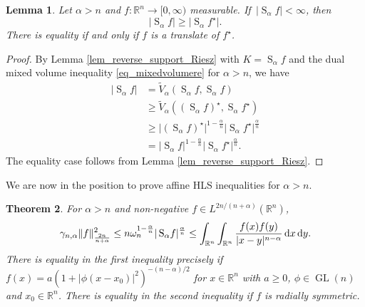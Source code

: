 \documentclass{amsart}
\newtheorem{theorem}{Theorem}
\newtheorem{lemma}[theorem]{Lemma}
\newcommand{\gln}{\operatorname{GL}(n)}
\newcommand{\R}{\mathbb R}
\renewcommand{\d}{\,\mathrm{d}}
\newcommand{\vol}[1]{\vert #1\vert}
\newcommand{\hls}[1]{\operatorname{S}_{#1}\!} %
\begin{document}
\begin{lemma}\label{lem_new_rearrangement2}
Let $\alpha>n$ and $f:\R^n\to [0,\infty)$ measurable. If 
$\,\vol{\hls \alpha f}<\infty$, then
\begin{equation}
\vol{\hls \alpha f}\ge \vol{\hls \alpha f^\star}.
\end{equation}
There is equality if and only if $f$ is a translate of $f^\star$. 
\end{lemma}
\begin{proof} By Lemma \ref{lem_reverse_support_Riesz} with $K=\hls \alpha f$ and the dual mixed volume inequality \eqref{eq_mixedvolumere} for $\alpha>n$,  we have
\begin{align}
	\vol{\hls\alpha f}
	&= \tilde V_\alpha(\hls \alpha f, \hls\alpha f)\\ 
	&\geq \tilde V_\alpha((\hls\alpha f)^\star, \hls\alpha f^\star)\\
	&\geq \vol{(\hls\alpha f)^\star}^{1-\frac {\alpha}n} \vol{\hls\alpha f^\star}^{\frac \alpha n}\\
	&= \vol{\hls \alpha f}^{1-\frac {\alpha}n} \vol{\hls\alpha f^\star}^{\frac \alpha n}.
\end{align}
The equality case follows from Lemma \ref{lem_reverse_support_Riesz}. 
\end{proof}

We are now in the position to prove affine HLS inequalities for $\alpha>n$.

\begin{theorem}\label{thm_aHLS2}
For $\alpha>n$ and non-negative $f\in L^{{2n}/({n+\alpha})}(\R^n)$,
\begin{equation}
\gamma_{n,\alpha} \Vert f\Vert_{\frac{2n}{n+\alpha}}^2
\le
n \omega_n^{{1-\frac \alpha n}} 
\vol{\hls \alpha f}^{\frac \alpha n}
\\
\le
\int_{\R^n}\int_{\R^n} \frac{f(x) f(y)}{\vert x-y\vert^{n-\alpha}} \d x\d y.
\end{equation}
There is equality in the first inequality precisely if $f(x) = a (1 +|\phi (x-x_0)|^2)^{-(n-\alpha)/2}$ for $x\in\R^n$ with $a\ge 0$, $\phi\in\gln$ and $x_0\in\R^n$.
There is equality in the second inequality if $f$ is radially symmetric.
\end{theorem}
\end{document}
